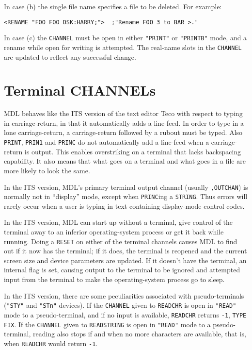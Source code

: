 \documentclass[a4paper]{scrbook}
\begin{document}
In case (b) the single file name specifies a file to be deleted. For example:

\begin{verbatim}
<RENAME "FOO FOO DSK:HARRY;">  ;"Rename FOO 3 to BAR >."
\end{verbatim}

In case (c) the \texttt{CHANNEL} must be open in either \texttt{"PRINT"} or \texttt{"PRINTB"} mode, and a rename while open
for writing is attempted. The real-name slots in the \texttt{CHANNEL} are updated to reflect any successful change.

\section{Terminal CHANNELs}\label{terminal-channels}

MDL behaves like the ITS  version of the text editor Teco with respect to typing in carriage-return, in
that it automatically adds a line-feed. In order to type in a lone carriage-return, a carriage-return followed by a rubout
must be typed. Also \texttt{PRINT}, \texttt{PRIN1} and \texttt{PRINC}
 do not automatically add a line-feed when a carriage-return is output. This enables overstriking on
a terminal that lacks backspacing capability. It also means that what goes on a terminal and what goes in a file are more
likely to look the same.

In the ITS version, MDL's primary terminal output channel (usually \texttt{,OUTCHAN}) is normally not in ``display'' mode,
except when \texttt{PRINC}ing a \texttt{STRING}. Thus errors will rarely occur when a user is typing in text containing
display-mode control codes.

In the ITS version, MDL can start up without a terminal, give control of the terminal away to an inferior operating-system
process or get it back while running. Doing a \texttt{RESET}  on either of the terminal channels
causes MDL to find out if it now has the terminal; if it does, the terminal is reopened and the current screen size and
device parameters are updated. If it doesn't have the terminal, an internal flag is set, causing output to the terminal to
be ignored and attempted input from the terminal to make the operating-system process go to sleep.

In the ITS version, there are some peculiarities associated with pseudo-terminals (\texttt{"STY"}
 and \texttt{"STn"} devices). If the \texttt{CHANNEL} given to \texttt{READCHR}
 is open in \texttt{"READ"} mode to a pseudo-terminal, and if no input is available,
\texttt{READCHR} returns \texttt{-1}, \texttt{TYPE} \texttt{FIX}. If the \texttt{CHANNEL} given to \texttt{READSTRING}
 is open in \texttt{"READ"} mode to a pseudo-terminal, reading also stops if and when no more
characters are available, that is, when \texttt{READCHR} would return \texttt{-1}.
\end{document}
